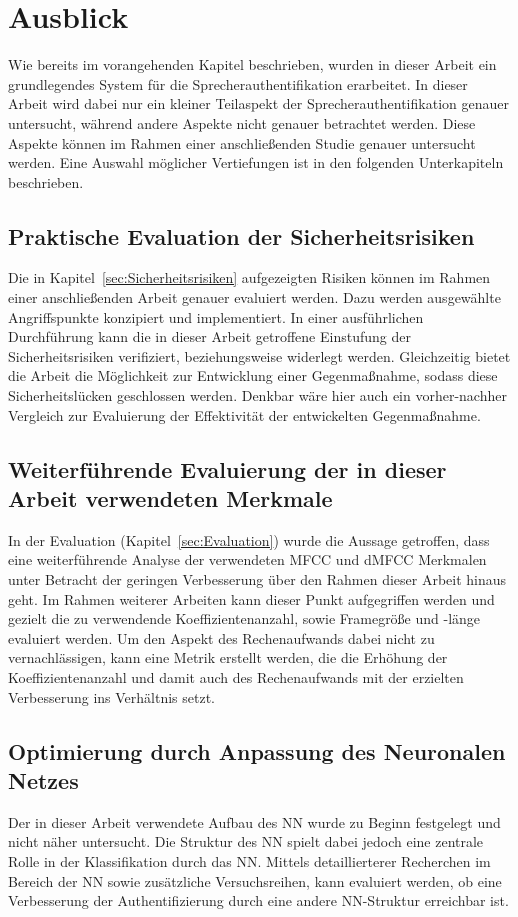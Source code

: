 \section{Ausblick}\label{sec:Ausblick}
Wie bereits im vorangehenden Kapitel beschrieben, wurden in dieser Arbeit ein grundlegendes System für die Sprecherauthentifikation erarbeitet.
In dieser Arbeit wird dabei nur ein kleiner Teilaspekt der Sprecherauthentifikation genauer untersucht, während andere Aspekte nicht genauer betrachtet werden.
Diese Aspekte können im Rahmen einer anschließenden Studie genauer untersucht werden.
Eine Auswahl möglicher Vertiefungen ist in den folgenden Unterkapiteln beschrieben.

\subsection{Praktische Evaluation der Sicherheitsrisiken}
Die in Kapitel~\ref{sec:Sicherheitsrisiken} aufgezeigten Risiken können im Rahmen einer anschließenden Arbeit genauer evaluiert werden.
Dazu werden ausgewählte Angriffspunkte konzipiert und implementiert.
In einer ausführlichen Durchführung kann die in dieser Arbeit getroffene Einstufung der Sicherheitsrisiken verifiziert, beziehungsweise widerlegt werden.
Gleichzeitig bietet die Arbeit die Möglichkeit zur Entwicklung einer Gegenmaßnahme, sodass diese Sicherheitslücken geschlossen werden.
Denkbar wäre hier auch ein vorher-nachher Vergleich zur Evaluierung der Effektivität der entwickelten Gegenmaßnahme.

\subsection{Weiterführende Evaluierung der in dieser Arbeit verwendeten Merkmale}
In der Evaluation (Kapitel~\ref{sec:Evaluation}) wurde die Aussage getroffen, dass eine weiterführende Analyse der verwendeten \ac{MFCC} und \ac{dMFCC} Merkmalen unter Betracht der geringen Verbesserung über den Rahmen dieser Arbeit hinaus geht.
Im Rahmen weiterer Arbeiten kann dieser Punkt aufgegriffen werden und gezielt die zu verwendende Koeffizientenanzahl, sowie Framegröße und -länge evaluiert werden.
Um den Aspekt des Rechenaufwands dabei nicht zu vernachlässigen, kann eine Metrik erstellt werden, die die Erhöhung der Koeffizientenanzahl und damit auch des Rechenaufwands mit der erzielten Verbesserung ins Verhältnis setzt.

\subsection{Optimierung durch Anpassung des Neuronalen Netzes}
Der in dieser Arbeit verwendete Aufbau des \ac{NN} wurde zu Beginn festgelegt und nicht näher untersucht.
Die Struktur des \ac{NN} spielt dabei jedoch eine zentrale Rolle in der Klassifikation durch das \ac{NN}.
Mittels detaillierterer Recherchen im Bereich der \ac{NN} sowie zusätzliche Versuchsreihen, kann evaluiert werden, ob eine Verbesserung der Authentifizierung durch eine andere \ac{NN}-Struktur erreichbar ist.

